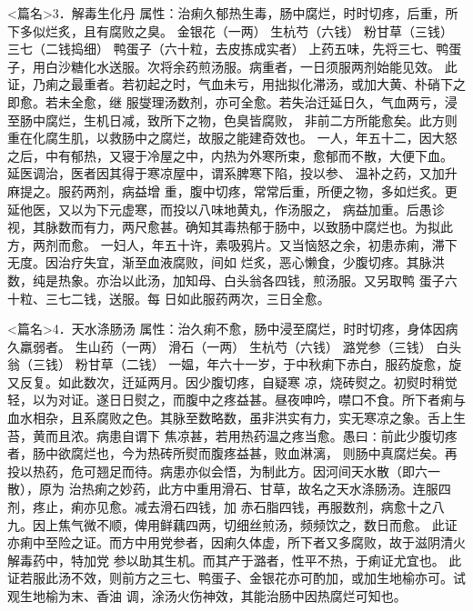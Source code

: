 \documentclass[a4paper,12pt,UTF8,twoside]{ctexbook}
\begin{document}
<篇名>3．解毒生化丹
属性：治痢久郁热生毒，肠中腐烂，时时切疼，后重，所下多似烂炙，且有腐败之臭。 
金银花（一两） 生杭芍（六钱） 粉甘草（三钱） 三七（二钱捣细） 鸭蛋子（六十粒，去皮拣成实者） 
上药五味，先将三七、鸭蛋子，用白沙糖化水送服。次将余药煎汤服。病重者，一日须服两剂始能见效。 
此证，乃痢之最重者。若初起之时，气血未亏，用拙拟化滞汤，或加大黄、朴硝下之即愈。若未全愈，继 
服燮理汤数剂，亦可全愈。若失治迁延日久，气血两亏，浸至肠中腐烂，生机日减，致所下之物，色臭皆腐败， 
非前二方所能愈矣。此方则重在化腐生肌，以救肠中之腐烂，故服之能建奇效也。 
一人，年五十二，因大怒之后，中有郁热，又寝于冷屋之中，内热为外寒所束，愈郁而不散，大便下血。 
延医调治，医者因其得于寒凉屋中，谓系脾寒下陷，投以参、 温补之药，又加升麻提之。服药两剂，病益增 
重，腹中切疼，常常后重，所便之物，多如烂炙。更延他医，又以为下元虚寒，而投以八味地黄丸，作汤服之， 
病益加重。后愚诊视，其脉数而有力，两尺愈甚。确知其毒热郁于肠中，以致肠中腐烂也。为拟此方，两剂而愈。 
一妇人，年五十许，素吸鸦片。又当恼怒之余，初患赤痢，滞下无度。因治疗失宜，渐至血液腐败，间如 
烂炙，恶心懒食，少腹切疼。其脉洪数，纯是热象。亦治以此汤，加知母、白头翁各四钱，煎汤服。又另取鸭 
蛋子六十粒、三七二钱，送服。每 
日如此服药两次，三日全愈。 


<篇名>4．天水涤肠汤
属性：治久痢不愈，肠中浸至腐烂，时时切疼，身体因病久羸弱者。 
生山药（一两） 滑石（一两） 生杭芍（六钱） 潞党参（三钱） 白头翁（三钱） 粉甘草（二钱） 
一媪，年六十一岁，于中秋痢下赤白，服药旋愈，旋又反复。如此数次，迁延两月。因少腹切疼，自疑寒 
凉，烧砖熨之。初熨时稍觉轻，以为对证。遂日日熨之，而腹中之疼益甚。昼夜呻吟，噤口不食。所下者痢与 
血水相杂，且系腐败之色。其脉至数略数，虽非洪实有力，实无寒凉之象。舌上生苔，黄而且浓。病患自谓下 
焦凉甚，若用热药温之疼当愈。愚曰∶前此少腹切疼者，肠中欲腐烂也，今为热砖所熨而腹疼益甚，败血淋漓， 
则肠中真腐烂矣。再投以热药，危可翘足而待。病患亦似会悟，为制此方。因河间天水散（即六一散），原为 
治热痢之妙药，此方中重用滑石、甘草，故名之天水涤肠汤。连服四剂，疼止，痢亦见愈。减去滑石四钱，加 
赤石脂四钱，再服数剂，病愈十之八九。因上焦气微不顺，俾用鲜藕四两，切细丝煎汤，频频饮之，数日而愈。 
此证亦痢中至险之证。而方中用党参者，因痢久体虚，所下者又多腐败，故于滋阴清火解毒药中，特加党 
参以助其生机。而其产于潞者，性平不热，于痢证尤宜也。 
此证若服此汤不效，则前方之三七、鸭蛋子、金银花亦可酌加，或加生地榆亦可。试观生地榆为末、香油 
调，涂汤火伤神效，其能治肠中因热腐烂可知也。 
\end{document}

